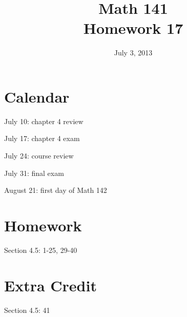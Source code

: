 \documentclass{exam}
\date{July 3, 2013}
\author{}
\title{Math 141 \\ Homework 17}
\begin{document}
    \maketitle

    \section{Calendar}
    \begin{itemize*}
      \item July 10: chapter 4 review
      \item July 17: chapter 4 exam
      \item July 24: course review
      \item July 31: final exam
      \item August 21: first day of Math 142 
    \end{itemize*}

    \section{Homework}
    Section 4.5: 1-25, 29-40 

    \ifprintanswers
      \pagebreak
    \fi

    \section{Extra Credit}
    Section 4.5: 41
\end{document}

